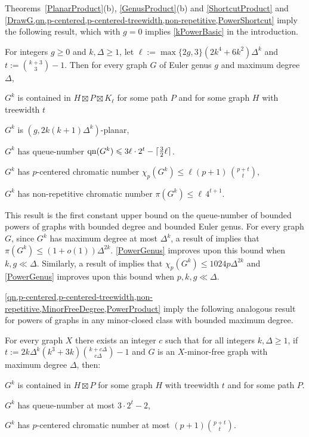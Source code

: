 \documentclass{patmorin}
\newcommand{\note}[2]{\noindent{\color{red}[#1:~#2]}}
\DeclareMathOperator{\qn}{qn}
\DeclarePairedDelimiter{\ceil}{\lceil}{\rceil}
\renewcommand{\le}{\leqslant}
\renewcommand{\geq}{\geqslant}
\renewcommand{\leq}{\leqslant}
\begin{document}
Theorems~\ref{PlanarProduct}(b), \ref{GenusProduct}(b) and \cref{ShortcutProduct} and  \cref{DrawG,qn,p-centered,p-centered-treewidth,non-repetitive,PowerShortcut} imply the following result, which with $g=0$ implies  \cref{kPowerBasic} in the introduction.

\begin{thm}
\label{PowerGenus}
For integers $g\geq 0$ and $k,\Delta\geq 1$, let $\ell:= \max\{2g,3\} (2k^4+6k^2) \Delta^{k}$ and $t:= \binom{k+3}{3}-1$. Then for every graph $G$ of Euler genus $g$ and maximum degree $\Delta$,
\begin{compactitem}
\item $G^k$ is contained in $H\boxtimes P \boxtimes K_{\ell}$ for some path $P$ and for some graph $H$ with treewidth $t$
\item $G^k$ is $(g, 2k(k+1)\Delta^{k} )$-planar,
\item $G^k$ has queue-number $\qn(G^k) \leq 3 \ell \cdot 2^t - \ceil{\tfrac{3}{2}\ell}$.
\item $G^k$ has  $p$-centered chromatic number $\chi_p(G^k) \leq \ell (p+1)\,  \binom{p+t}{t}$,
\item $G^k$ has  non-repetitive chromatic number $ \pi(G^k) \leq \ell \, 4^{t+1}$.
\end{compactitem}
\end{thm}

\note{DW}{\cref{PowerGenus} has been updated}

This result is the first constant upper bound on the queue-number of bounded powers of graphs with bounded degree and bounded Euler genus.  For every graph $G$, since $G^k$ has maximum degree at most $\Delta^k$, a result of \citet{DJKW16} implies that $\pi(G^k) \leq (1+o(1))\Delta^{2k}$. \cref{PowerGenus} improves upon this bound when $k,g\ll\Delta$.  Similarly, a result of \citet{DFMS21} implies that $\chi_p(G^k)\le 1024p\Delta^{2k}$ and \cref{PowerGenus} improves upon this bound when $p,k,g\ll\Delta$.

\cref{qn,p-centered,p-centered-treewidth,non-repetitive,MinorFreeDegree,PowerProduct} imply the following analogous result for powers of graphs in any minor-closed class with bounded maximum degree.

\begin{thm}
\label{PowerMinor}
For every graph $X$ there exists an integer $c$ such that for all integers $k,\Delta\geq 1$, if $t:= 2k\Delta^{k}(k^3+3k)\binom{k+c\Delta}{c\Delta}-1$ and $G$ is an $X$-minor-free graph with maximum degree $\Delta$, then:
\begin{compactitem}
	\item $G^k$ is contained in $H\boxtimes P$ for some graph $H$ with treewidth $t$ and for some path $P$.
	\item $G^k$ has queue-number at most $3\cdot 2^t-2$,
	\item $G^k$ has $p$-centered chromatic number at most $(p+1)\binom{p+t}{t}$.
\end{compactitem}
\end{thm}
\end{document}
